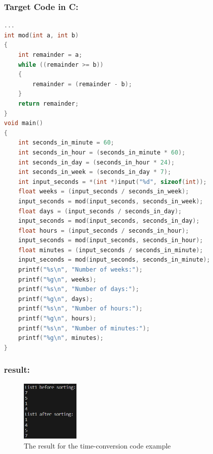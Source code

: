 \subsubsection{Target Code in C:}
\begin{lstlisting}[language = c, firstnumber=106, label={list:acceptance_test_timeconversion_output}, caption=Acceptance test output of the timeconversion code example]
...
int mod(int a, int b) 
{ 
    int remainder = a; 
    while ((remainder >= b)) 
    { 
        remainder = (remainder - b); 
    } 
    return remainder; 
} 
void main() 
{ 
    int seconds_in_minute = 60; 
    int seconds_in_hour = (seconds_in_minute * 60); 
    int seconds_in_day = (seconds_in_hour * 24); 
    int seconds_in_week = (seconds_in_day * 7); 
    int input_seconds = *(int *)input("%d", sizeof(int)); 
    float weeks = (input_seconds / seconds_in_week); 
    input_seconds = mod(input_seconds, seconds_in_week); 
    float days = (input_seconds / seconds_in_day); 
    input_seconds = mod(input_seconds, seconds_in_day); 
    float hours = (input_seconds / seconds_in_hour); 
    input_seconds = mod(input_seconds, seconds_in_hour); 
    float minutes = (input_seconds / seconds_in_minute); 
    input_seconds = mod(input_seconds, seconds_in_minute); 
    printf("%s\n", "Number of weeks:"); 
    printf("%g\n", weeks); 
    printf("%s\n", "Number of days:"); 
    printf("%g\n", days); 
    printf("%s\n", "Number of hours:"); 
    printf("%g\n", hours); 
    printf("%s\n", "Number of minutes:"); 
    printf("%g\n", minutes); 
} 
\end{lstlisting}

\subsubsection{result:}

\begin{figure}[H] 
    \begin{center}
        \includegraphics[width=0.25\textwidth]{Files/Billeder: Appendix/Insertion Sort Result.png}
    \end{center}
    \caption{The result for the time-conversion code example}
    \label{figure:timeconversion_result}
\end{figure}


